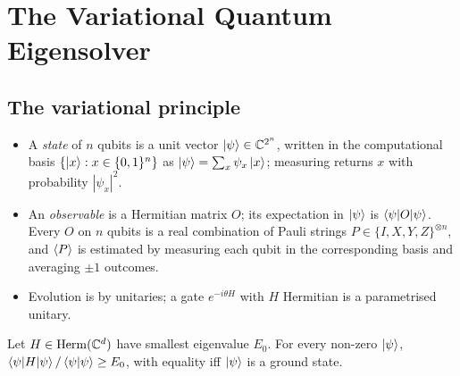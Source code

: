\documentclass[handoutsbeamer.tex]{subfiles}
\begin{document}
\thispagestyle{empty}

\ona{ \setcounter{chapter}{4} } %
\chapter{The Variational Quantum Eigensolver}\label{C.VQE}


\section{The variational principle}

\begin{frame}
\begin{itemize}\setlength\itemsep{0.3em}
    \item A \emph{state} of $n$ qubits is a unit vector $\ket\psi \in \mathbb{C}^{2^n}$, written in the computational basis $\{\ket{x} : x \in \{0,1\}^n\}$ as $\ket\psi = \sum_x \psi_x \ket x$; measuring returns $x$ with probability $|\psi_x|^2$.
    \item An \emph{observable} is a Hermitian matrix $O$; its expectation in $\ket\psi$ is $\braket{\psi|O|\psi}$. Every $O$ on $n$ qubits is a real combination of Pauli strings $P \in \{I,X,Y,Z\}^{\otimes n}$, and $\braket{P}$ is estimated by measuring each qubit in the corresponding basis and averaging $\pm1$ outcomes.
    \item Evolution is by unitaries; a gate $e^{-i\theta H}$ with $H$ Hermitian is a parametrised unitary.
\end{itemize}
\begin{thm}\label{thm:ch05:variational}
Let $H \in \mathrm{Herm}(\mathbb{C}^d)$ have smallest eigenvalue $E_0$. For every non-zero $\ket\psi$, $\braket{\psi|H|\psi}/\braket{\psi|\psi} \ge E_0$, with equality iff $\ket\psi$ is a ground state.
\end{thm}
\end{frame}
\end{document}
